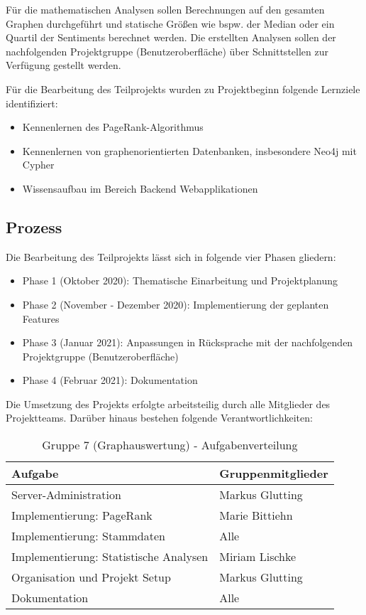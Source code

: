 Für die mathematischen Analysen sollen Berechnungen auf den gesamten Graphen durchgeführt und statische Größen wie bspw. der Median oder ein Quartil der Sentiments berechnet werden. Die erstellten Analysen sollen der nachfolgenden Projektgruppe (Benutzeroberfläche) über Schnittstellen zur Verfügung gestellt werden.

Für die Bearbeitung des Teilprojekts wurden zu Projektbeginn folgende Lernziele identifiziert:
\begin{itemize}
  \item Kennenlernen des PageRank-Algorithmus
  \item Kennenlernen von graphenorientierten Datenbanken, insbesondere Neo4j mit Cypher
  \item Wissensaufbau im Bereich Backend Webapplikationen
\end{itemize}

\subsection{Prozess}
Die Bearbeitung des Teilprojekts lässt sich in folgende vier Phasen gliedern:
\begin{itemize}
  \item Phase 1 (Oktober 2020): Thematische Einarbeitung und Projektplanung
  \item Phase 2 (November - Dezember 2020): Implementierung der geplanten Features
  \item Phase 3 (Januar 2021): Anpassungen in Rücksprache mit der nachfolgenden Projektgruppe (Benutzeroberfläche)
  \item Phase 4 (Februar 2021): Dokumentation
\end{itemize}


Die Umsetzung des Projekts erfolgte arbeitsteilig durch alle Mitglieder des Projektteams.
Darüber hinaus bestehen folgende Verantwortlichkeiten:


\begin{table}[ht]
\caption{Gruppe 7 (Graphauswertung) - Aufgabenverteilung}
\label{tab:7-aufgabenverteilung}
\begin{tabular}{|p{9cm}|p{5cm}|}
\hline
\rowcolor{Gray}
Aufgabe & Gruppenmitglieder \\
\hline
Server-Administration & Markus Glutting \\
Implementierung: PageRank & Marie Bittiehn \\
Implementierung: Stammdaten & Alle \\
Implementierung: Statistische Analysen & Miriam Lischke \\
Organisation und Projekt Setup & Markus Glutting \\
Dokumentation & Alle \\
\hline
\end{tabular}
\end{table}



